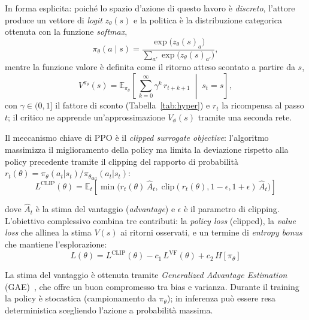In forma esplicita: poich\'e lo spazio d'azione di questo lavoro \`e \emph{discreto},
l'attore produce un vettore di \emph{logit} $z_\theta(s)$ e la politica \`e la distribuzione
categorica ottenuta con la funzione \emph{softmax},
\begin{equation}
    \pi_\theta(a \mid s) = \frac{\exp\!\big(z_\theta(s)_a\big)}
                                {\sum_{a'} \exp\!\big(z_\theta(s)_{a'}\big)},
    \label{eq:policy_softmax}
\end{equation}
mentre la funzione valore \`e definita come il ritorno atteso scontato a partire da $s$,
\begin{equation}
    V^{\pi_\theta}(s) = \mathbb{E}_{\pi_\theta}\!\left[\,
        \sum_{k=0}^{\infty} \gamma^{k}\, r_{t+k+1} \;\middle|\; s_t = s \right],
    \label{eq:value_fn}
\end{equation}
con $\gamma \in (0,1]$ il fattore di sconto (Tabella~\ref{tab:hyper}) e $r_{t}$ la ricompensa
al passo $t$; il critico ne apprende un'approssimazione $V_\phi(s)$ tramite una seconda rete.

Il meccanismo chiave di PPO \`e il \emph{clipped surrogate objective}: l'algoritmo
massimizza il miglioramento della policy ma limita la deviazione rispetto alla policy
precedente tramite il clipping del rapporto di probabilit\`a
$r_t(\theta) = \pi_\theta(a_t|s_t) / \pi_{\theta_{\text{old}}}(a_t|s_t)$:
\begin{equation}
    L^{\text{CLIP}}(\theta) = \mathbb{E}_t\!\left[\min\!\big(
    r_t(\theta)\,\hat{A}_t,\;
    \text{clip}(r_t(\theta), 1-\epsilon, 1+\epsilon)\,\hat{A}_t \big)\right]
    \label{eq:ppo_clip}
\end{equation}

dove $\hat{A}_t$ \`e la stima del vantaggio (\emph{advantage}) e $\epsilon$ \`e il
parametro di clipping. L'obiettivo complessivo combina tre contributi: la \emph{policy
loss} (clipped), la \emph{value loss} che allinea la stima $V(s)$ ai ritorni osservati, e
un termine di \emph{entropy bonus} che mantiene l'esplorazione:
\begin{equation}
    L(\theta) = L^{\text{CLIP}}(\theta) - c_1\,L^{\text{VF}}(\theta) + c_2\,H[\pi_\theta]
\end{equation}

La stima del vantaggio \`e ottenuta tramite \emph{Generalized Advantage Estimation}
(GAE)~\citep{gae}, che offre un buon compromesso tra bias e varianza. Durante il training
la policy \`e stocastica (campionamento da $\pi_\theta$); in inferenza pu\`o essere resa
deterministica scegliendo l'azione a probabilit\`a massima.

